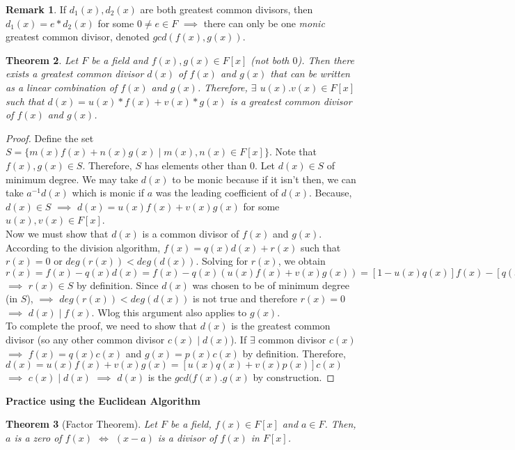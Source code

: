 \documentclass[11pt]{article}
\newtheorem{thm}{Theorem}[section]
\theoremstyle{definition}
\newtheorem{remark}[thm]{Remark}
\numberwithin{equation}{section}
\begin{document}
\begin{remark}
If $d_{1}(x), d_{2}(x)$ are both greatest common divisors, then $d_{1}(x) = e*d_{2}(x)$ for some $0 \neq e \in F$ $\implies$ there can only be one \textit{monic} greatest common divisor, denoted $gcd(f(x), g(x))$.
\end{remark}

\begin{thm}
Let $F$ be a field and $f(x), g(x) \in F[x]$ (not both $0$). Then there exists a greatest common divisor $d(x)$ of $f(x)$ and $g(x)$ that can be written as a linear combination of $f(x)$ and $g(x)$. Therefore, $\exists$ $u(x). v(x) \in F[x]$ such that $d(x) = u(x)*f(x) + v(x)*g(x)$ is a greatest common divisor of $f(x)$ and $g(x)$.
\end{thm}

\begin{proof}
Define the set $S = \{m(x)f(x)+n(x)g(x) \mid m(x), n(x) \in F[x]\}$. Note that $f(x), g(x) \in S$. Therefore, $S$ has elements other than $0$. Let $d(x) \in S$ of minimum degree. We may take $d(x)$ to be monic because if it isn't then, we can take $a^{-1}d(x)$ which is monic if $a$ was the leading coefficient of $d(x)$. Because, $d(x) \in S$ $\implies$ $d(x) = u(x)f(x)+v(x)g(x)$ for some $u(x), v(x) \in F[x]$.\\
Now we must show that $d(x)$ is a common divisor of $f(x)$ and $g(x)$. According to the division algorithm, $f(x) = q(x)d(x)+r(x)$ such that $r(x) = 0$ or $deg(r(x)) < deg(d(x))$. Solving for $r(x)$, we obtain $r(x) = f(x)-q(x)d(x)=f(x)-q(x)(u(x)f(x)+v(x)g(x)) = [1-u(x)q(x)]f(x)-[q(x)v(x)]g(x)$ $\implies$ $r(x) \in S$ by definition. Since $d(x)$ was chosen to be of minimum degree (in $S$), $\implies$ $deg(r(x)) < deg(d(x))$ is not true and therefore $r(x) = 0$ $\implies$ $d(x) \mid f(x)$. Wlog this argument also applies to $g(x)$.\\
To complete the proof, we need to show that $d(x)$ is the greatest common divisor (so any other common divisor $c(x) \mid d(x)$). If $\exists$ common divisor $c(x)$ $\implies$ $f(x) = q(x)c(x)$ and $g(x) = p(x)c(x)$ by definition. Therefore, $d(x) = u(x)f(x) + v(x)g(x) = [u(x)q(x)+v(x)p(x)]c(x)$ $\implies$ $c(x) \mid d(x)$ $\implies$ $d(x)$ is the $gcd(f(x). g(x)$ by construction.
\end{proof}

\textbf{Practice using the Euclidean Algorithm}

\begin{thm}[Factor Theorem]
Let $F$ be a field, $f(x) \in F[x]$ and $a \in F$. Then, $a$ is a zero of $f(x)$ $\Longleftrightarrow$ $(x-a)$ is a divisor of $f(x)$ in $F[x]$.
\end{thm}
\end{document}
